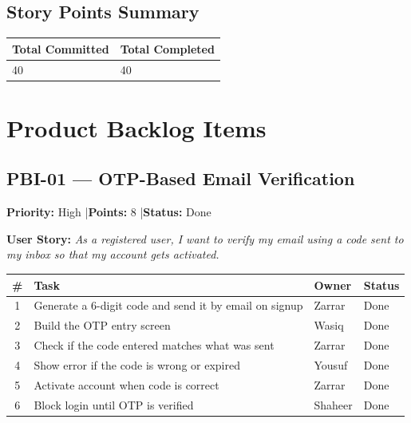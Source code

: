 \documentclass[12pt,a4paper]{article}
\begin{document}
\vspace{1.5em}

\subsection*{Story Points Summary}
\begin{tabularx}{0.6\textwidth}{|X|X|}
\hline
\rowcolor{headerbg}\color{white}\bfseries Total Committed & \color{white}\bfseries Total Completed \\ \hline
40 & 40 \\ \hline
\end{tabularx}

\vspace{2em}

\section{Product Backlog Items}

\subsection*{PBI-01 --- OTP-Based Email Verification}
\textbf{Priority:} High \quad|\quad \textbf{Points:} 8 \quad|\quad \textbf{Status:} Done

\vspace{0.3em}
\textbf{User Story:} \textit{As a registered user, I want to verify my email using a code sent to my inbox so that my account gets activated.}

\vspace{0.5em}
\noindent\renewcommand{\arraystretch}{1.3}
\begin{tabularx}{\textwidth}{|c|X|l|l|}
\hline
\rowcolor{headerbg}\color{white}\bfseries \# & \color{white}\bfseries Task & \color{white}\bfseries Owner & \color{white}\bfseries Status \\ \hline
1 & Generate a 6-digit code and send it by email on signup & Zarrar & Done \\ \hline
\rowcolor{rowgray} 2 & Build the OTP entry screen & Wasiq & Done \\ \hline
3 & Check if the code entered matches what was sent & Zarrar & Done \\ \hline
\rowcolor{rowgray} 4 & Show error if the code is wrong or expired & Yousuf & Done \\ \hline
5 & Activate account when code is correct & Zarrar & Done \\ \hline
\rowcolor{rowgray} 6 & Block login until OTP is verified & Shaheer & Done \\ \hline
\end{tabularx}
\end{document}

